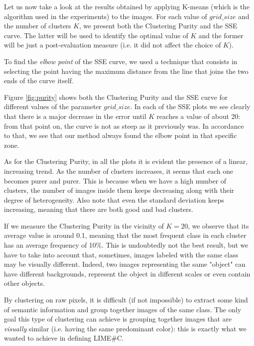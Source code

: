 \documentclass[12pt, twoside, a4paper]{report}
\begin{document}
Let us now take a look at the results obtained by applying K-means (which is the algorithm used in the experiments) to the images. For each value of $grid\_size$ and the number of clusters $K$, we present both the Clustering Purity and the SSE curve. The latter will be used to identify the optimal value of $K$ and the former will be just a post-evaluation measure (i.e. it did not affect the choice of $K$). 

To find the \textit{elbow point} of the SSE curve, we used a technique that consists in selecting the point having the maximum distance from the line that joins the two ends of the curve itself.

Figure \ref{fig:purity} shows both the Clustering Purity and the SSE curve for different values of the parameter $grid\_size$. In each of the SSE plots we see clearly that there is a major decrease in the error until $K$ reaches a value of about 20: from that point on, the curve is not as steep as it previously was. In accordance to that, we see that our method always found the elbow point in that specific zone.

As for the Clustering Purity, in all the plots it is evident the presence of a linear, increasing trend. As the number of clusters increases, it seems that each one becomes purer and purer. This is because when we have a high number of clusters, the number of images inside them keeps decreasing along with their degree of heterogeneity. Also note that even the standard deviation keeps increasing, meaning that there are both good and bad clusters.

If we measure the Clustering Purity in the vicinity of $K=20$, we observe that its average value is around 0.1, meaning that the most frequent class in each cluster has an average frequency of 10\%. 
This is undoubtedly not the best result, but we have to take into account that, sometimes, images labeled with the same class may be visually different. Indeed, two images representing the same "object" can have different backgrounds, represent the object in different scales or even contain other objects. 

By clustering on raw pixels, it is difficult (if not impossible) to extract some kind of semantic information and group together images of the same class. The only goal  this type of clustering can achieve is grouping together images that are \textit{visually} similar (i.e. having the same predominant color): this is exactly what we wanted to achieve in defining LIME\#C. 
\end{document}
